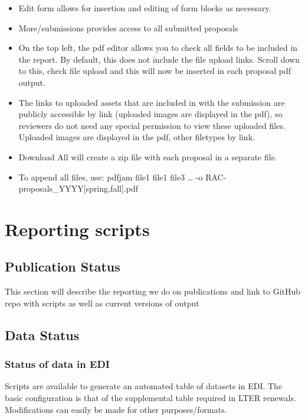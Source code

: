 \documentclass[
  letterpaper,
  DIV=11,
  numbers=noendperiod]{scrreprt}
\begin{document}
\begin{itemize}
\item
  Edit form allows for insertion and editing of form blocks as
  necessary.
\item
  More/submissions provides access to all submitted proposals
\item
  On the top left, the pdf editor allows you to check all fields to be
  included in the report. By default, this does not include the file
  upload links. Scroll down to this, check file upload and this will now
  be inserted in each proposal pdf output.
\item
  The links to uploaded assets that are included in with the submission
  are publicly accessible by link (uploaded images are displayed in the
  pdf), so reviewers do not need any special permission to view these
  uploaded files. Uploaded images are displayed in the pdf, other
  filetypes by link.
\item
  Download All will create a zip file with each proposal in a separate
  file.
\item
  To append all files, use: pdfjam file1 file1 file3 \ldots{} -o
  RAC-proposals\_YYYY{[}spring,fall{]}.pdf
\end{itemize}


\chapter{Reporting scripts}\label{reporting-scripts}

\section{Publication Status}\label{publication-status}

This section will describe the reporting we do on publications and link
to GitHub repo with scripts as well as current versions of output

\section{Data Status}\label{data-status}

\subsection{Status of data in EDI}\label{status-of-data-in-edi}

Scripts are available to generate an automated table of datasets in EDI.
The basic configuration is that of the supplemental table required in
LTER renewals. Modifications can easily be made for other
purposes/formats.
\end{document}
